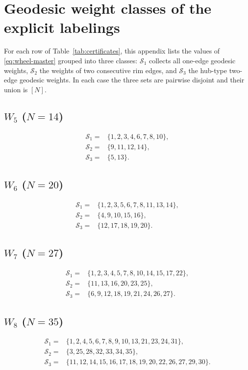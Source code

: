 \documentclass[11pt]{article}
\theoremstyle{definition}
\theoremstyle{remark}
\numberwithin{equation}{section}
\begin{document}
\appendix
\section{Geodesic weight classes of the explicit labelings}\label{app:partitions}

For each row of Table~\ref{tab:certificates}, this appendix lists the values of \eqref{eq:wheel-master} grouped into three classes: $\mathcal S_1$ collects all one-edge geodesic weights, $\mathcal S_2$ the weights of two consecutive rim edges, and $\mathcal S_3$ the hub-type two-edge geodesic weights. In each case the three sets are pairwise disjoint and their union is $[N]$.

\subsection*{$W_5$ ($N=14$)}
\begin{align*}
\mathcal S_1={}&\{1,2,3,4,6,7,8,10\},\\
\mathcal S_2={}&\{9,11,12,14\},\\
\mathcal S_3={}&\{5,13\}.
\end{align*}

\subsection*{$W_6$ ($N=20$)}
\begin{align*}
\mathcal S_1={}&\{1,2,3,5,6,7,8,11,13,14\},\\
\mathcal S_2={}&\{4,9,10,15,16\},\\
\mathcal S_3={}&\{12,17,18,19,20\}.
\end{align*}

\subsection*{$W_7$ ($N=27$)}
\begin{align*}
\mathcal S_1={}&\{1,2,3,4,5,7,8,10,14,15,17,22\},\\
\mathcal S_2={}&\{11,13,16,20,23,25\},\\
\mathcal S_3={}&\{6,9,12,18,19,21,24,26,27\}.
\end{align*}

\subsection*{$W_8$ ($N=35$)}
\begin{align*}
\mathcal S_1={}&\{1,2,4,5,6,7,8,9,10,13,21,23,24,31\},\\
\mathcal S_2={}&\{3,25,28,32,33,34,35\},\\
\mathcal S_3={}&\{11,12,14,15,16,17,18,19,20,22,26,27,29,30\}.
\end{align*}
\end{document}
